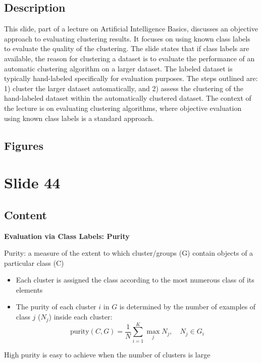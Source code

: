 \documentclass{article}%
\begin{document}
\subsection{Description}%
This slide, part of a lecture on Artificial Intelligence Basics, discusses an objective approach to evaluating clustering results.  It focuses on using known class labels to evaluate the quality of the clustering.  The slide states that if class labels are available, the reason for clustering a dataset is to evaluate the performance of an automatic clustering algorithm on a larger dataset.  The labeled dataset is typically hand-labeled specifically for evaluation purposes.  The steps outlined are: 1) cluster the larger dataset automatically, and 2) assess the clustering of the hand-labeled dataset within the automatically clustered dataset.  The context of the lecture is on evaluating clustering algorithms, where objective evaluation using known class labels is a standard approach.%
\subsection{Figures}%
\begin{figure}[H]%
\centering%
\end{figure}

%
\newpage%
\section{Slide 44}%
\label{sec:Slide44}%
\subsection{Content}%

\textbf{Evaluation via Class Labels: Purity}

Purity: a measure of the extent to which cluster/groups (G) contain objects of a particular class (C)

\begin{itemize}
    \item Each cluster is assigned the class according to the most numerous class of its elements
    \item The purity of each cluster $i$ in $G$ is determined by the number of examples of class $j$ ($N_j$) inside each cluster:
    \[
    \text{purity}(C, G) = \frac{1}{N} \sum_{i=1}^{K} \max_{j} N_j, \quad N_j \in G_i
    \]
\end{itemize}

High purity is easy to achieve when the number of clusters is large
\end{document}
